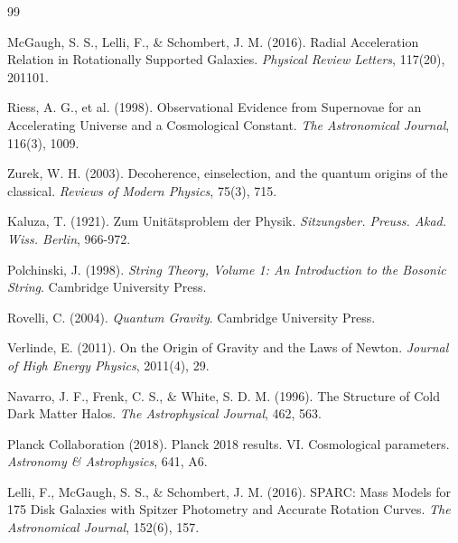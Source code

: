 \documentclass[12pt,a4paper]{article}
\begin{document}
\begin{thebibliography}{99}

McGaugh, S. S., Lelli, F., \& Schombert, J. M. (2016). 
Radial Acceleration Relation in Rotationally Supported Galaxies. 
\textit{Physical Review Letters}, 117(20), 201101.

Riess, A. G., et al. (1998). 
Observational Evidence from Supernovae for an Accelerating Universe and a Cosmological Constant. 
\textit{The Astronomical Journal}, 116(3), 1009.

Zurek, W. H. (2003). 
Decoherence, einselection, and the quantum origins of the classical. 
\textit{Reviews of Modern Physics}, 75(3), 715.

Kaluza, T. (1921). 
Zum Unitätsproblem der Physik. 
\textit{Sitzungsber. Preuss. Akad. Wiss. Berlin}, 966-972.

Polchinski, J. (1998). 
\textit{String Theory, Volume 1: An Introduction to the Bosonic String}. 
Cambridge University Press.

Rovelli, C. (2004). 
\textit{Quantum Gravity}. 
Cambridge University Press.

Verlinde, E. (2011). 
On the Origin of Gravity and the Laws of Newton. 
\textit{Journal of High Energy Physics}, 2011(4), 29.

Navarro, J. F., Frenk, C. S., \& White, S. D. M. (1996). 
The Structure of Cold Dark Matter Halos. 
\textit{The Astrophysical Journal}, 462, 563.

Planck Collaboration (2018). 
Planck 2018 results. VI. Cosmological parameters. 
\textit{Astronomy \& Astrophysics}, 641, A6.

Lelli, F., McGaugh, S. S., \& Schombert, J. M. (2016). 
SPARC: Mass Models for 175 Disk Galaxies with Spitzer Photometry and Accurate Rotation Curves. 
\textit{The Astronomical Journal}, 152(6), 157.

\end{thebibliography}
\end{document}
